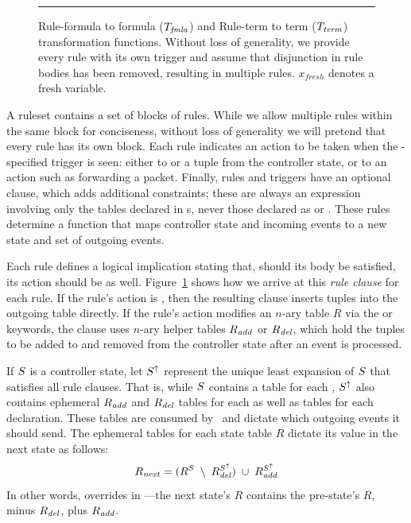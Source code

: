 \begin{figure}
\caption{\small Rule-formula to formula ($T_{\mathit{fmla}}$) and Rule-term to term ($T_{\mathit{term}}$)
transformation functions. Without loss of generality, we provide every rule with its own
 trigger and assume that disjunction in rule bodies has been removed,
resulting in multiple rules. $x_{fresh}$ denotes a fresh variable.}
\label{fig:rule2formula}
\hrule
\end{figure}

A ruleset contains a set of  blocks of rules. While we allow
multiple rules within the same  block for conciseness, without loss of
generality we will pretend that every rule has its own  block. Each
rule indicates an action to be taken when the -specified trigger is
seen: either to  or  a tuple from the controller state,
or to  an action such as forwarding a packet. Finally, rules and triggers have an
optional  clause, which adds additional constraints; these are always an
expression involving only the tables declared in s, never
those declared as  or . 
These rules determine a function that maps controller state and incoming
events to a new state and set of outgoing events.

Each rule defines a logical implication
stating that, should its body be satisfied, its action should be as well. 
Figure~\ref{fig:rule2formula} shows how we arrive at this \emph{rule clause} for each rule.
If the rule's action is , then the resulting clause inserts tuples into the outgoing table directly. 
If the rule's action modifies an $n$-ary table $R$ via the  or  keywords, the clause
uses $n$-ary helper tables $R_{\mathit{add}}$ or $R_{\mathit{del}}$, which hold the tuples to be
added to and removed from the controller state after an event is processed.

If $S$ is a controller state, let $S^{\uparrow}$ represent the unique least expansion
of $S$ that satisfies all rule clauses. That is, while $S$ contains a table
for each , $S^{\uparrow}$ also contains ephemeral $R_{\mathit{add}}$ and $R_{\mathit{del}}$
tables for each  as well as tables for each 
declaration. These  tables are consumed by \flowlog\ and dictate which outgoing events it should send. The ephemeral
tables for each state table $R$ dictate its value in the next state
as follows: 
\[R_{\mathit{next}} = (R^{S} \; \setminus \; R_{\mathit{del}}^{S^{\uparrow}}) \; \cup \; R_{\mathit{add}}^{S^{\uparrow}}\]
In other words,  overrides  in \flowlog---the next state's $R$ contains
the pre-state's $R$, minus $R_{\mathit{del}}$, plus $R_{\mathit{add}}$.

